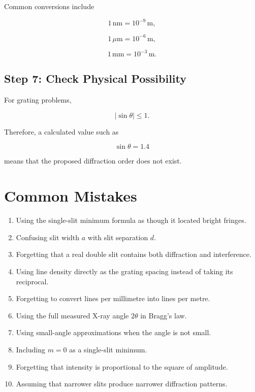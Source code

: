 \documentclass{studentnotes}
\begin{document}
Common conversions include

\[
    1\,\text{nm}=10^{-9}\,\text{m},
\]

\[
    1\,\mu\text{m}=10^{-6}\,\text{m},
\]

\[
    1\,\text{mm}=10^{-3}\,\text{m}.
\]

\subsection{Step 7: Check Physical Possibility}

For grating problems,

\[
    |\sin\theta|\leq1.
\]

Therefore, a calculated value such as

\[
    \sin\theta=1.4
\]

means that the proposed diffraction order does not exist.

\section{Common Mistakes}

\begin{enumerate}
    \item Using the single-slit minimum formula as though it located bright fringes.

    \item Confusing slit width \(a\) with slit separation \(d\).

    \item Forgetting that a real double slit contains both diffraction and interference.

    \item Using line density directly as the grating spacing instead of taking its reciprocal.

    \item Forgetting to convert lines per millimetre into lines per metre.

    \item Using the full measured X-ray angle \(2\theta\) in Bragg's law.

    \item Using small-angle approximations when the angle is not small.

    \item Including \(m=0\) as a single-slit minimum.

    \item Forgetting that intensity is proportional to the square of amplitude.

    \item Assuming that narrower slits produce narrower diffraction patterns.
\end{enumerate}
\end{document}
